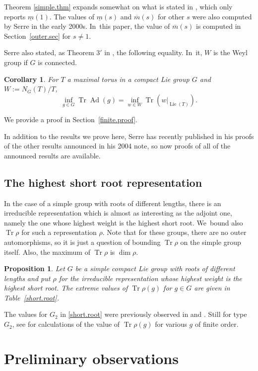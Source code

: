 \documentclass[JEP,XML,SOM,Unicode,NoFloatCountersInSection,published]{cedram}
\newtheorem{cor}[equation]{Corollary}
\newtheorem{prop}[equation]{Proposition}
\theoremstyle{definition}
\newcommand{\mmin}{\underline{m}}
\newcommand{\mmax}{\overline{m}}
\DeclareMathOperator{\Tr}{Tr}
\DeclareMathOperator{\Ad}{Ad}
\DeclareMathOperator{\Lie}{Lie}
\begin{document}
Theorem \ref{simple.thm} expands somewhat on what is stated in \cite{Se:trace}, which only reports $\mmin(1)$. The values of $\mmin(s)$ and $\mmax(s)$ for other $s$ were also computed by Serre in the early 2000s. In~this paper, the value of $\mmax(s)$ is computed in Section~\ref{outer.sec} for $s \ne 1$.

Serre also stated, as Theorem 3$'$ in \cite{Se:trace}, the following equality. In~it, $W$ is the Weyl group if $G$ is connected.

\begin{cor} \label{thm.3p}
For $T$ a maximal torus in a compact Lie group $G$ and $W := N_G(T)/T$,
\[
\inf_{g \in G} \Tr \Ad(g) = \inf_{w \in W} \Tr(w\vert_{\Lie(T)}).
\]
\end{cor}

We provide a proof in Section~\ref{finite.proof}.

In addition to the results we prove here, Serre has recently published in \cite{Se:zeros} his proofs of the other results announced in his 2004 note, so now proofs of all of the announced results are available.

\subsection*{The highest short root representation}
In the case of a simple group with roots of different lengths, there is an irreducible representation which is almost as interesting as the adjoint one, namely the one whose highest weight is the highest short root. We~bound also $\Tr \rho$ for such a representation $\rho$. Note that for these groups, there are no outer automorphisms, so it is just a question of bounding $\Tr \rho$ on the simple group itself. Also, the maximum of $\Tr \rho$ is $\dim \rho$.

\begin{prop} \label{short.prop}
Let $G$ be a simple compact Lie group with roots of different lengths and put $\rho$ for the irreducible representation whose highest weight is the highest short root. The extreme values of $\Tr \rho(g)$ for $g \in G$ are given in Table~\ref{short.root}.
\end{prop}

The values for $G_2$ in \autoref{short.root} were previously observed in \cite[5.5]{Katz:G2} and \cite[eq.\,(37)]{Kaiser}. Still for type $G_2$, see \cite[pp.\,270,\,271]{Griess:G2} for calculations of the value of $\Tr \rho(g)$ for various $g$ of finite order.

\section{Preliminary observations}
\end{document}
